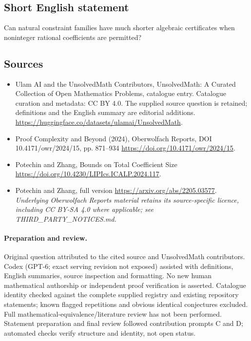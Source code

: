 \documentclass[11pt]{article}
\begin{document}
\subsection{Short English statement}
Can natural constraint families have much shorter algebraic certificates when noninteger rational coefficients are permitted?
\subsection{Sources}
\begin{itemize}
\item[\hypertarget{source:statement:1}{S1}] Ulam AI and the UnsolvedMath Contributors, UnsolvedMath: A Curated Collection of Open Mathematics Problems, catalogue entry. Catalogue curation and metadata: CC BY 4.0. The supplied source question is retained; definitions and the English summary are editorial additions.
\url{https://huggingface.co/datasets/ulamai/UnsolvedMath}.
\item[\hypertarget{source:statement:2}{S2}] Proof Complexity and Beyond (2024), Oberwolfach Reports, DOI 10.4171/owr/2024/15, pp. 871--934
\url{https://doi.org/10.4171/owr/2024/15}.
\item[\hypertarget{source:statement:3}{S3}] Potechin and Zhang, Bounds on Total Coefficient Size
\url{https://doi.org/10.4230/LIPIcs.ICALP.2024.117}.
\item[\hypertarget{source:statement:4}{S4}] Potechin and Zhang, full version
\url{https://arxiv.org/abs/2205.03577}.
\textit{Underlying Oberwolfach Reports material retains its source-specific licence, including CC BY-SA 4.0 where applicable; see THIRD\_PARTY\_NOTICES.md.}
\end{itemize}
\paragraph{Preparation and review.}
Original question attributed to the cited source and UnsolvedMath contributors. Codex (GPT-6; exact serving revision not exposed) assisted with definitions, English summaries, source inspection and formatting. No new human mathematical authorship or independent proof verification is asserted. Catalogue identity checked against the complete supplied registry and existing repository statements; known flagged repetitions and obvious identical conjectures excluded. Full mathematical-equivalence/literature review has not been performed. Statement preparation and final review followed contribution prompts C and D; automated checks verify structure and identity, not open status.
\label{end:statement}
\end{document}
